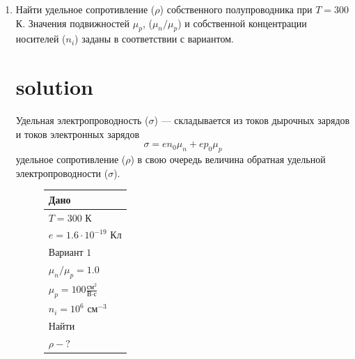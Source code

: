 \documentclass[12pt,a4paper]{article}
\theoremstyle{plain}
\theoremstyle{definition}
\theoremstyle{remark}
\numberwithin{equation}{section}
\begin{document}
\begin{enumerate}
\begin{figure}[H]
\begin{minipage}[t]{0.7\textwidth}
\begin{equation*}
\begin{aligned}
                \end{aligned}
            \end{equation*}
            концентрация дырок ищется из концентрации электронов
            \begin{equation*}
                p_0 = \frac{{n_i}^2}{n_0} \qquad p_0 = \frac{\left(2.4 \cdot 10^{13}\right)^2}{\luaexec{tex.sprint(value_with_mantice((10 ^ 14 + ((10 ^ 14) ^ 2 + 4 * (2.4 * 10^(13))^2)^(0.5)) / 2, 5, 0, 0))}}=\luaexec{tex.sprint(value_with_mantice(((2.4 * 10^(13))^2)/((10 ^ 14 + ((10 ^ 14) ^ 2 + 4 * (2.4 * 10^(13))^2)^(0.5)) / 2), 3, 0, 0))}
            \end{equation*}
        \end{minipage}
    \end{figure}

    \pagebreak
    
    \item Найти удельное сопротивление ($\rho$) собственного полупроводника при 
    $T = 300$ К. Значения подвижностей $\mu_p$, ($\mu_n / \mu_p$) и собственной 
    концентрации носителей ($n_i$) заданы в соответствии с вариантом.

    \section*{solution}    

    \qquad Удельная электропроводность ($\sigma$) — складывается из токов дырочных зарядов и 
    токов электронных зарядов
    \begin{equation*}
        \sigma = en_0\mu_n + ep_0\mu_p
    \end{equation*}
    удельное сопротивление ($\rho$) в свою очередь величина обратная удельной электропроводности ($\sigma$).

    \begin{figure}[h]
        \begin{minipage}[t]{0.28\textwidth}
            \vspace{0em}
            \begin{tabularx}{\linewidth}{|X|}
                \hline
                Дано \\
                \hline
                $T = 300$ К \\
                $e = 1.6 \cdot 10^{-19}$ Кл \\
                \hline
                Вариант $1$ \\
                \hline
                $\mu_n/\mu_p = 1.0$ \\
                $\mu_p = 100 \frac{\text{см}^2}{\text{В} \cdot \text{с}}$ \\
                $n_i = 10^6$ см$^{-3}$ \\
                \hline
                Найти \\
                \hline
                $\rho - ?$ \\
                \hline
            \end{tabularx}


\end{minipage}
\end{figure}
\end{enumerate}
\end{document}

